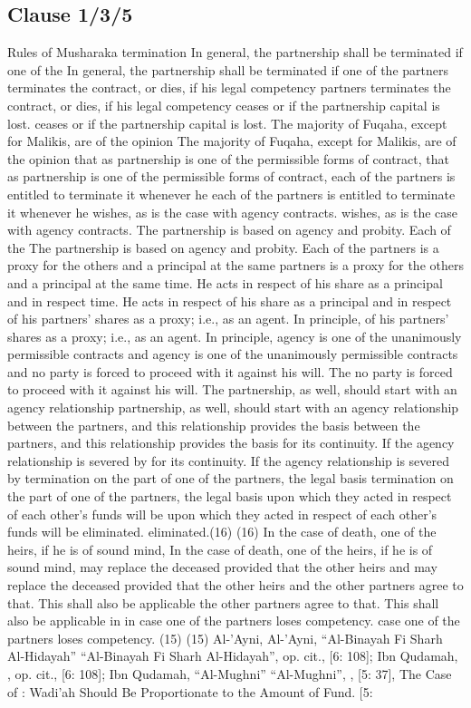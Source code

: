 \documentclass{article}%
\begin{document}
\subsection{Clause 1/3/5}%
\label{subsec:Clause1/3/5}%
Rules of Musharaka termination   In general, the partnership shall be terminated if one of the    In general, the partnership shall be terminated if one of the  partners terminates the contract, or dies, if his legal competency  partners terminates the contract, or dies, if his legal competency  ceases or if the partnership capital is lost. ceases or if the partnership capital is lost.   The majority of Fuqaha, except for Malikis, are of the opinion    The majority of Fuqaha, except for Malikis, are of the opinion  that as partnership is one of the permissible forms of contract,  that as partnership is one of the permissible forms of contract,  each of the partners is entitled to terminate it whenever he  each of the partners is entitled to terminate it whenever he  wishes, as is the case with agency contracts. wishes, as is the case with agency contracts.   The partnership is based on agency and probity. Each of the    The partnership is based on agency and probity. Each of the  partners is a proxy for the others and a principal at the same  partners is a proxy for the others and a principal at the same  time. He acts in respect of his share as a principal and in respect  time. He acts in respect of his share as a principal and in respect  of his partners’ shares as a proxy; i.e., as an agent. In principle,  of his partners’ shares as a proxy; i.e., as an agent. In principle,  agency is one of the unanimously permissible contracts and  agency is one of the unanimously permissible contracts and  no party is forced to proceed with it against his will. The  no party is forced to proceed with it against his will. The  partnership, as well, should start with an agency relationship  partnership, as well, should start with an agency relationship  between the partners, and this relationship provides the basis  between the partners, and this relationship provides the basis  for its continuity. If the agency relationship is severed by  for its continuity. If the agency relationship is severed by  termination on the part of one of the partners, the legal basis  termination on the part of one of the partners, the legal basis  upon which they acted in respect of each other’s funds will be  upon which they acted in respect of each other’s funds will be  eliminated. eliminated.(16) (16)   In the case of death, one of the heirs, if he is of sound mind,    In the case of death, one of the heirs, if he is of sound mind,  may replace the deceased provided that the other heirs and  may replace the deceased provided that the other heirs and  the other partners agree to that. This shall also be applicable  the other partners agree to that. This shall also be applicable in  in  case one of the partners loses competency. case one of the partners loses competency. (15) (15) Al-’Ayni,   Al-’Ayni, “Al-Binayah Fi Sharh Al-Hidayah” “Al-Binayah Fi Sharh Al-Hidayah”, op. cit., [6: 108]; Ibn Qudamah,  , op. cit., [6: 108]; Ibn Qudamah, “Al-Mughni” “Al-Mughni”, ,  [5: 37], The Case of : Wadi’ah Should Be Proportionate to the Amount of Fund.  [5: 
\end{document}
